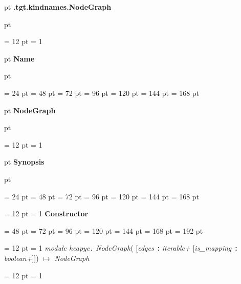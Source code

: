 {\par \pagebreak[3]  pt \noindent
{\LARGE {\bf .tgt.kindnames.NodeGraph\/}}\par {} pt
} \noindent
{\par \noindent
{\par \pagebreak[3.300000] \noindent \hangindent = 12 pt \hangafter = 1 
{\par \pagebreak[3]  pt \noindent
{\Large {\bf Name\/}}\par {} pt
} \noindent
\par}
{\par \noindent  \leftskip = 24 pt  \leftmargini = 48 pt  \leftmarginii = 72 pt  \leftmarginiii = 96 pt  \leftmarginiv = 120 pt  \leftmarginv = 144 pt  \leftmarginvi = 168 pt {\par \pagebreak[3]  pt \noindent
{\Large {\bf NodeGraph\/}}\par {} pt
} \noindent
\par}
{\par \pagebreak[3.300000] \noindent \hangindent = 12 pt \hangafter = 1 
{\par \pagebreak[3]  pt \noindent
{\Large {\bf Synopsis\/}}\par {} pt
} \noindent
\par}
{\par \noindent  \leftskip = 24 pt  \leftmargini = 48 pt  \leftmarginii = 72 pt  \leftmarginiii = 96 pt  \leftmarginiv = 120 pt  \leftmarginv = 144 pt  \leftmarginvi = 168 pt {\par \noindent
{\par \pagebreak[3.200000] \noindent \hangindent = 12 pt \hangafter = 1 
{\large {\bf Constructor\/}}\par}
{\par \noindent  \leftskip = 48 pt  \leftmargini = 72 pt  \leftmarginii = 96 pt  \leftmarginiii = 120 pt  \leftmarginiv = 144 pt  \leftmarginv = 168 pt  \leftmarginvi = 192 pt {\par \noindent
{\par \pagebreak[3.100000] \noindent \hangindent = 12 pt \hangafter = 1 
 {\em module heapyc\/}{\large {\tt .\/} {\em NodeGraph\/}}( {[}{\em edges\/}~{\bf :}  {\em iterable+\/}  {[}{\em is{\_}mapping\/}~{\bf :}  {\em boolean+\/}]]) \(\mapsto \)  {\em NodeGraph\/}\par}
\par}
\par}
{\par \pagebreak[3.200000] \noindent \hangindent = 12 pt \hangafter = 1 
}}}}
